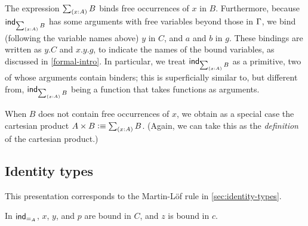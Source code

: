 The expression $\tsm{x:A} B$ binds free occurrences of $x$ in $B$. Furthermore, because
$\ind{\tsm{x:A} B}$ has some arguments with free variables beyond those in $\Gamma$,
we bind (following the variable names above) $y$ in $C$, and $a$ and $b$ in $g$.
These bindings are written as $y.C$ and $x.y.g$, to indicate the names of the bound
variables, as discussed in \autoref{formal-intro}. In particular, we treat $\ind{\tsm{x:A} B}$ as a primitive,
two of whose arguments contain binders; this is superficially similar to, but
different from, $\ind{\tsm{x:A} B}$ being a function that takes functions as
arguments.

When $B$ does not contain free occurrences of $x$, we obtain as a special case
the cartesian product $A \times B \defeq \tsm{x:A} B$. (Again, we can take this
as the \emph{definition} of the cartesian product.)

\subsection{Identity types}

This presentation corresponds to the Martin-L\"{o}f rule in
\autoref{sec:identity-types}.


In $\mathsf{ind}_{{=}_A}$, $x$, $y$, and $p$ are bound in $C$, and $z$ is bound in
$c$.


